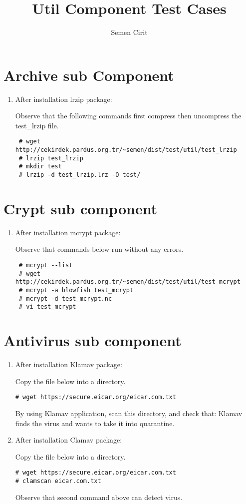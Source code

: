 \documentclass[a4paper,10pt]{article}
\title{Util Component Test Cases}
\author{Semen Cirit}
\begin{document}
\maketitle
\section{Archive sub Component}
\begin{enumerate}
 \item After installation  lrzip package:

Observe that the following commands first compress then uncompress the test\_lrzip file.
\begin{verbatim}
 # wget http://cekirdek.pardus.org.tr/~semen/dist/test/util/test_lrzip
 # lrzip test_lrzip
 # mkdir test
 # lrzip -d test_lrzip.lrz -O test/
\end{verbatim}


\end{enumerate}


\section{Crypt sub component}
\begin{enumerate}
 \item After installation  mcrypt package:

Observe that commands below run without any errors.
\begin{verbatim}
 # mcrypt --list
 # wget http://cekirdek.pardus.org.tr/~semen/dist/test/util/test_mcrypt
 # mcrypt -a blowfish test_mcrypt
 # mcrypt -d test_mcrypt.nc
 # vi test_mcrypt
\end{verbatim}


\end{enumerate}


\section{Antivirus sub component}
\begin{enumerate}
\item After installation  Klamav package:

Copy the file below into a directory. 
\begin{verbatim}
# wget https://secure.eicar.org/eicar.com.txt
\end{verbatim}

By using Klamav application, scan this directory, and check that: Klamav finds the virus and wants to take it into quarantine.

\item After installation  Clamav package:

Copy the file below into a directory. 
\begin{verbatim}
# wget https://secure.eicar.org/eicar.com.txt
# clamscan eicar.com.txt
\end{verbatim}

Observe that second command above can detect virus.

\end{enumerate}
\end{document}
